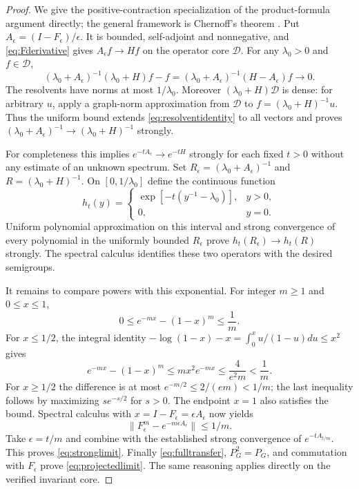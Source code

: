 \documentclass[11pt]{article}
\begin{document}
\begin{proof}
We give the positive-contraction specialization of the product-formula
argument directly; the general framework is Chernoff's theorem
\cite{Chernoff}. Put
$A_\epsilon=(I-F_\epsilon)/\epsilon$. It is bounded, self-adjoint and
nonnegative, and \eqref{eq:Fderivative} gives
$A_\epsilon f\to Hf$ on the operator core $\mathscr D$.
For any $\lambda_0>0$ and $f\in\mathscr D$,
\begin{equation}\label{eq:resolventidentity}
 (\lambda_0+A_\epsilon)^{-1}(\lambda_0+H)f-f
 =(\lambda_0+A_\epsilon)^{-1}(H-A_\epsilon)f\longrightarrow0.
\end{equation}
The resolvents have norms at most $1/\lambda_0$. Moreover
$(\lambda_0+H)\mathscr D$ is dense: for arbitrary $u$, apply a
graph-norm approximation from $\mathscr D$ to
$f=(\lambda_0+H)^{-1}u$. Thus the uniform bound extends
\eqref{eq:resolventidentity} to all vectors and proves
$(\lambda_0+A_\epsilon)^{-1}\to(\lambda_0+H)^{-1}$ strongly.

For completeness this implies $e^{-tA_\epsilon}\to e^{-tH}$ strongly
for each fixed $t>0$ without any estimate of an unknown spectrum.
Set $R_\epsilon=(\lambda_0+A_\epsilon)^{-1}$ and
$R=(\lambda_0+H)^{-1}$. On $[0,1/\lambda_0]$ define the continuous
function
\[
 h_t(y)=\begin{cases}\exp[-t(y^{-1}-\lambda_0)],&y>0,\\0,&y=0.
 \end{cases}
\]
Uniform polynomial approximation on this interval and strong convergence
of every polynomial in the uniformly bounded $R_\epsilon$ prove
$h_t(R_\epsilon)\to h_t(R)$ strongly. The spectral calculus identifies
these two operators with the desired semigroups.

It remains to compare powers with this exponential. For integer $m\geq1$
and $0\leq x\leq1$,
\begin{equation}\label{eq:scalarpower}
 0\leq e^{-mx}-(1-x)^m\leq\frac1m.
\end{equation}
For $x\leq1/2$, the integral identity
$-\log(1-x)-x=\int_0^x u/(1-u)du\leq x^2$ gives
\[
 e^{-mx}-(1-x)^m
 \leq mx^2e^{-mx}\leq\frac4{e^2m}<\frac1m.
\]
For $x\geq1/2$ the difference is at most $e^{-m/2}\leq2/(em)<1/m$;
the last inequality follows by maximizing $s e^{-s/2}$ for $s>0$.
The endpoint $x=1$ also satisfies the bound. Spectral calculus with
$x=I-F_\epsilon=\epsilon A_\epsilon$ now yields
\[
 \|F_\epsilon^m-e^{-m\epsilon A_\epsilon}\|\leq1/m.
\]
Take $\epsilon=t/m$ and combine with the established strong convergence
of $e^{-tA_{t/m}}$. This proves \eqref{eq:stronglimit}.
Finally \eqref{eq:fulltransfer}, $P_G^2=P_G$, and commutation with
$F_\epsilon$ prove \eqref{eq:projectedlimit}. The same reasoning
applies directly on the verified invariant core.
\end{proof}
\end{document}
